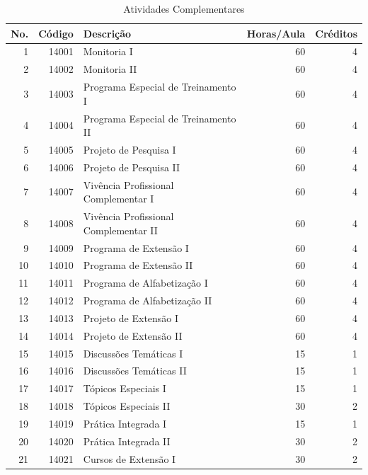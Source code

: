 \documentclass[
	12pt,				%
	openright,			%
  oneside,     %
	a4paper,			%
	english,			%
	french,				%
	spanish,			%
	brazil				%
	]{abntex2}
\begin{document}
    \begin{longtable}{r|r|l|r|r}
      \caption{Atividades Complementares}
      \label{tab:atividadescomplementares}%
      \\
\hline
    \textbf{No.} & \textbf{Código} & \textbf{Descrição} & \textbf{Horas/Aula} & \textbf{Créditos} \\
    \hline
    1     & 14001 & Monitoria I & 60    & 4 \\
    \hline
    2     & 14002 & Monitoria II & 60    & 4 \\
    \hline
    3     & 14003 & Programa Especial de Treinamento I & 60    & 4 \\
    \hline
    4     & 14004 & Programa Especial de Treinamento II & 60    & 4 \\
    \hline
    5     & 14005 & Projeto de Pesquisa I & 60    & 4 \\
    \hline
    6     & 14006 & Projeto de Pesquisa II & 60    & 4 \\
    \hline
    7     & 14007 & Vivência Profissional Complementar I & 60    & 4 \\
    \hline
    8     & 14008 & Vivência Profissional Complementar II & 60    & 4 \\
    \hline
    9     & 14009 & Programa de Extensão I & 60    & 4 \\
    \hline
    10    & 14010 & Programa de Extensão II & 60    & 4 \\
    \hline
    11    & 14011 & Programa de Alfabetização I & 60    & 4 \\
    \hline
    12    & 14012 & Programa de Alfabetização II & 60    & 4 \\
    \hline
    13    & 14013 & Projeto de Extensão I & 60    & 4 \\
    \hline
    14    & 14014 & Projeto de Extensão II & 60    & 4 \\
    \hline
    15    & 14015 & Discussões Temáticas I & 15    & 1 \\
    \hline
    16    & 14016 & Discussões Temáticas II & 15    & 1 \\
    \hline
    17    & 14017 & Tópicos Especiais I & 15    & 1 \\
    \hline
    18    & 14018 & Tópicos Especiais II & 30    & 2 \\
    \hline
    19    & 14019 & Prática Integrada I & 15    & 1 \\
    \hline
    20    & 14020 & Prática Integrada II & 30    & 2 \\
    \hline
    21    & 14021 & Cursos de Extensão I & 30    & 2 \\

\end{longtable}
\end{document}
